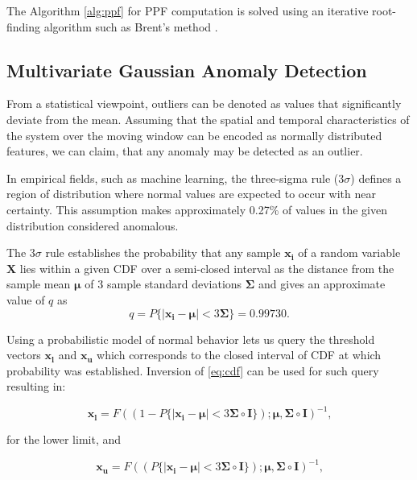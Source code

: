 The Algorithm \ref{alg:ppf} for PPF computation is solved using an iterative root-finding algorithm such as Brent's method \cite{Brent72}.

\subsection{Multivariate Gaussian Anomaly Detection}\label{AA:Anomaly}
From a statistical viewpoint, outliers can be denoted 
as values that significantly deviate from the mean. Assuming that the spatial and temporal characteristics of the system over the moving window can be encoded as normally distributed features, we can claim, that any anomaly may be detected as an outlier.

In empirical fields, such as machine learning, the three-sigma rule ($3\sigma$) defines a region of distribution where normal values are expected to occur with near certainty. This assumption makes approximately 0.27\% of values in the given distribution considered anomalous. 

The \(3\sigma\) rule establishes the probability that any sample \(\boldsymbol{x_i}\) of a random variable \(\boldsymbol{X}\) lies within a given CDF over a semi-closed interval as the distance from the sample mean \(\boldsymbol{\mu}\) of 3 sample standard deviations \(\boldsymbol{\Sigma}\) and gives an approximate value of $q$ as
\begin{equation}
q=P\{|\boldsymbol{x_i}-\boldsymbol{\mu}|<3\boldsymbol{\Sigma}\}=0.99730\text{.}
\end{equation}

Using a probabilistic model of normal behavior lets us query the threshold vectors \(\boldsymbol{x_{l}}\) and \(\boldsymbol{x_{u}}\) which corresponds to the closed interval of CDF at which probability was established. Inversion of \eqref{eq:cdf} can be used for such query resulting in:

\begin{equation}
\boldsymbol{x_l} = F((1 - P\{|\boldsymbol{x_i}-\boldsymbol{\mu}|<3\boldsymbol{\Sigma}\circ\boldsymbol{I}\}); \boldsymbol{\mu}, \boldsymbol{\Sigma}\circ\boldsymbol{I})^{-1}\text{,}\label{eq:thresh_low}
\end{equation}

for the lower limit, and

\begin{equation}
\boldsymbol{x_u} = F((P\{|\boldsymbol{x_i}-\boldsymbol{\mu}|<3\boldsymbol{\Sigma}\circ\boldsymbol{I}\}); \boldsymbol{\mu}, \boldsymbol{\Sigma}\circ\boldsymbol{I})^{-1}\text{,}\label{eq:thresh_high}
\end{equation}

